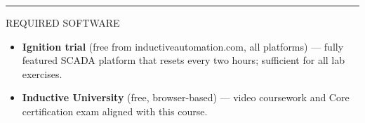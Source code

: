 \documentclass[10pt]{article}
\begin{document}
\smallskip
{\color{onavy}\rule{\linewidth}{0.4pt}}
\smallskip
{\small\sffamily\color{ogray}\MakeUppercase{Required Software}}
\smallskip

\begin{itemize}\small
  \item \textbf{Ignition trial} (free from inductiveautomation.com, all platforms) — fully featured SCADA platform that resets every two hours; sufficient for all lab exercises.
  \item \textbf{Inductive University} (free, browser-based) — video coursework and Core certification exam aligned with this course.
\end{itemize}


\vfill

\end{document}
